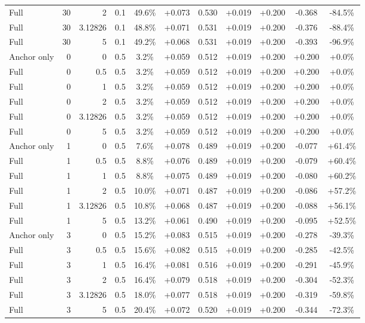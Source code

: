 \begin{table}[htbp]
\begin{tabular}{lrrrccccccc}
Full & 30 & 2 & 0.1 & 49.6\% & +0.073 & 0.530 & +0.019 & +0.200 & -0.368 & -84.5\% \\
Full & 30 & 3.12826 & 0.1 & 48.8\% & +0.071 & 0.531 & +0.019 & +0.200 & -0.376 & -88.4\% \\
Full & 30 & 5 & 0.1 & 49.2\% & +0.068 & 0.531 & +0.019 & +0.200 & -0.393 & -96.9\% \\
Anchor only & 0 & 0 & 0.5 & 3.2\% & +0.059 & 0.512 & +0.019 & +0.200 & +0.200 & +0.0\% \\
Full & 0 & 0.5 & 0.5 & 3.2\% & +0.059 & 0.512 & +0.019 & +0.200 & +0.200 & +0.0\% \\
Full & 0 & 1 & 0.5 & 3.2\% & +0.059 & 0.512 & +0.019 & +0.200 & +0.200 & +0.0\% \\
Full & 0 & 2 & 0.5 & 3.2\% & +0.059 & 0.512 & +0.019 & +0.200 & +0.200 & +0.0\% \\
Full & 0 & 3.12826 & 0.5 & 3.2\% & +0.059 & 0.512 & +0.019 & +0.200 & +0.200 & +0.0\% \\
Full & 0 & 5 & 0.5 & 3.2\% & +0.059 & 0.512 & +0.019 & +0.200 & +0.200 & +0.0\% \\
Anchor only & 1 & 0 & 0.5 & 7.6\% & +0.078 & 0.489 & +0.019 & +0.200 & -0.077 & +61.4\% \\
Full & 1 & 0.5 & 0.5 & 8.8\% & +0.076 & 0.489 & +0.019 & +0.200 & -0.079 & +60.4\% \\
Full & 1 & 1 & 0.5 & 8.8\% & +0.075 & 0.489 & +0.019 & +0.200 & -0.080 & +60.2\% \\
Full & 1 & 2 & 0.5 & 10.0\% & +0.071 & 0.487 & +0.019 & +0.200 & -0.086 & +57.2\% \\
Full & 1 & 3.12826 & 0.5 & 10.8\% & +0.068 & 0.487 & +0.019 & +0.200 & -0.088 & +56.1\% \\
Full & 1 & 5 & 0.5 & 13.2\% & +0.061 & 0.490 & +0.019 & +0.200 & -0.095 & +52.5\% \\
Anchor only & 3 & 0 & 0.5 & 15.2\% & +0.083 & 0.515 & +0.019 & +0.200 & -0.278 & -39.3\% \\
Full & 3 & 0.5 & 0.5 & 15.6\% & +0.082 & 0.515 & +0.019 & +0.200 & -0.285 & -42.5\% \\
Full & 3 & 1 & 0.5 & 16.4\% & +0.081 & 0.516 & +0.019 & +0.200 & -0.291 & -45.9\% \\
Full & 3 & 2 & 0.5 & 16.4\% & +0.079 & 0.518 & +0.019 & +0.200 & -0.304 & -52.3\% \\
Full & 3 & 3.12826 & 0.5 & 18.0\% & +0.077 & 0.518 & +0.019 & +0.200 & -0.319 & -59.8\% \\
Full & 3 & 5 & 0.5 & 20.4\% & +0.072 & 0.520 & +0.019 & +0.200 & -0.344 & -72.3\% \\

\end{tabular}
\end{table}
